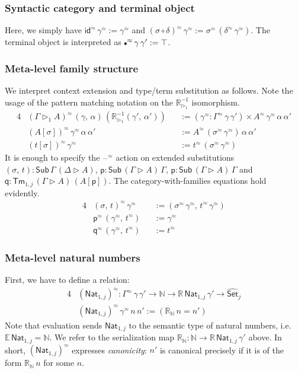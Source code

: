 \documentclass[acmsmall]{acmart}
\newcommand{\msf}[1]{\mathsf{#1}}
\newcommand{\mbb}[1]{\mathbb{#1}}
\newcommand{\wh}[1]{\widehat{#1}}
\newcommand{\ext}{\triangleright}
\newcommand{\Sub}{\msf{Sub}}
\newcommand{\Tm}{\msf{Tm}}
\newcommand{\p}{\mathsf{p}}
\newcommand{\q}{\mathsf{q}}
\newcommand{\Nat}{\msf{Nat}}
\newcommand{\emptycon}{\scaleobj{.75}\bullet}
\newcommand{\id}{\msf{id}}
\newcommand{\Set}{\mathsf{Set}}
\newcommand{\blank}{{\mathord{\hspace{1pt}\text{--}\hspace{1pt}}}}
\newcommand{\ev}{\mbb{E}}
\newcommand{\re}{\mbb{R}}
\theoremstyle{remark}
\newcommand{\whset}{\wh{\Set}}
\newcommand{\rexti}{\re_{\ext_1}^{-1}}
\newcommand{\rel}{^{\approx}}
\begin{document}
\subsubsection{Syntactic category and terminal object}
Here, we simply have $\id\rel\,\gamma\rel := \gamma\rel$ and $(\sigma \circ
\delta)\rel\,\gamma\rel := \sigma\rel\,(\delta\rel\,\gamma\rel)$. The terminal
object is interpreted as $\emptycon\rel\,\gamma\,\gamma' := \top$.

\subsubsection{Meta-level family structure}
We interpret context extension and type/term substitution as follows. Note the
usage of the pattern matching notation on the $\rexti$ isomorphism.
\begin{alignat*}{4}
  & (\Gamma \ext_1 A)\rel\,(\gamma,\,\alpha)\,(\rexti(\gamma',\,\alpha')) && :=
    (\gamma\rel : \Gamma\rel\,\gamma\,\gamma') \times A\rel\,\gamma\rel\,\alpha\,\alpha'\\
  & (A[\sigma])\rel\,\gamma\rel\,\alpha\,\alpha' && := A\rel\,(\sigma\rel\,\gamma\rel)\,\alpha\,\alpha'\\
  & (t[\sigma])\rel\,\gamma\rel\                 && := t\rel\,(\sigma\rel\,\gamma\rel)
\end{alignat*}
It is enough to specify the $\blank\rel$ action on extended substitutions
$(\sigma,\,t) : \Sub\,\Gamma\,(\Delta\ext A)$, $\p : \Sub\,(\Gamma\ext
A)\,\Gamma$, $\p : \Sub\,(\Gamma\ext A)\,\Gamma$ and $\q : \Tm_{1,j}\,(\Gamma
\ext A)\,(A[\p])$. The category-with-families equations hold evidently.
\begin{alignat*}{4}
  & (\sigma,\,t)\rel\,\gamma\rel                 && := (\sigma\rel\,\gamma\rel,\,t\rel\,\gamma\rel)\\
  & \p\rel\,(\gamma\rel,\,t\rel)                 && := \gamma\rel\\
  & \q\rel\,(\gamma\rel,\,t\rel)                 && := t\rel
\end{alignat*}

\subsubsection{Meta-level natural numbers} First, we have to define a relation:
\begin{alignat*}{4}
  & (\Nat_{1,j})\rel : \Gamma\rel\,\gamma\,\gamma' \to \mbb{N} \to \re\,\Nat_{1,j}\,\gamma' \to \whset_j\\
  & (\Nat_{1,j})\rel\,\gamma\rel\,n\,n' := (\re_{\mbb{N}}\,n = n')
\end{alignat*}
Note that evaluation sends $\Nat_{1,j}$ to the semantic type of natural numbers,
i.e.\ $\ev\,\Nat_{1,j} = \mbb{N}$. We refer to the serialization map
$\re_{\mbb{N}} : \mbb{N} \to \re\,\Nat_{1,j}\,\gamma'$ above. In short,
$(\Nat_{1,j})\rel$ expresses \emph{canonicity}: $n'$ is canonical precisely if
it is of the form $\re_{\mbb{N}}\,n$ for some $n$.
\end{document}
